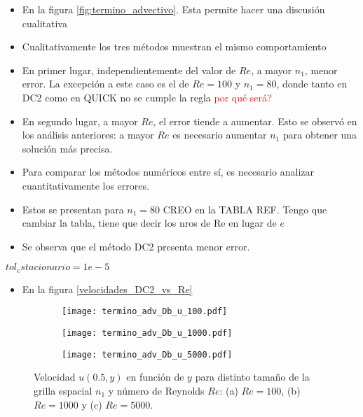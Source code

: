 \documentclass[aps,prb,twocolumn,superscriptaddress,floatfix,longbibliography,10pt]{revtex4-2}
\newcounter{para}
\begin{document}
\begin{itemize}
  \item En la figura \ref{fig:termino_advectivo}. Esta permite hacer una discusión cualitativa
  \item Cualitativamente los tres métodos muestran el mismo comportamiento
  \item En primer lugar, independientemente del valor de $Re$, a mayor $n_1$, menor error. La excepción a este caso es el de $Re = 100$ y $n_1 = 80$, donde tanto en DC2 como en QUICK no se cumple la regla \textcolor{red}{por qué será?}
  \item En segundo lugar, a mayor $Re$, el error tiende a aumentar. Esto se observó en los análisis anteriores: a mayor $Re$ es necesario aumentar $n_1$ para obtener una solución más precisa.
  \item Para comparar los métodos numéricos entre sí, es necesario analizar cuantitativamente los errores.
  \item Estos se presentan para $n_1 = 80$ CREO en la TABLA REF. Tengo que cambiar la tabla, tiene que decir los nros de Re en lugar de $e$
  \item Se observa que el método DC2 presenta menor error.
\end{itemize}

$tol_estacionario = 1e-5$

\begin{itemize}
  \item En la figura \ref{velocidades_DC2_vs_Re}
\end{itemize}


\onecolumngrid


\begin{figure}
  \centering
  \begin{subfigure}[b]{0.32\textwidth}
      \centering
      \texttt{[image: termino\_adv\_Db\_u\_100.pdf]}
      \caption{}
      \label{fig:termino_adv_Db_u_100}
  \end{subfigure}
  \hfill
  \begin{subfigure}[b]{0.32\textwidth}
      \centering
      \texttt{[image: termino\_adv\_Db\_u\_1000.pdf]}
      \caption{}
      \label{fig:termino_adv_Db_u_1000}
  \end{subfigure}
  \hfill
  \begin{subfigure}[b]{0.32\textwidth}
      \centering
      \texttt{[image: termino\_adv\_Db\_u\_5000.pdf]}
      \caption{}
      \label{fig:termino_adv_Db_u_5000}
  \end{subfigure}
     \caption{Velocidad $u(0.5,y)$ en función de $y$ para distinto tamaño de la grilla espacial $n_1$ y número de Reynolds $Re$: (a) $Re = 100$, (b) $Re = 1000$ y (c) $Re = 5000$.}
     \label{fig:velocidades_u_DC2_vs_Re}
\end{figure}
\end{document}
